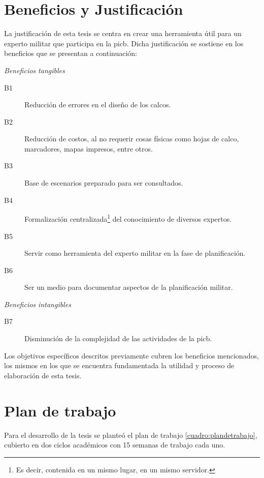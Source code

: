 
\section{Beneficios y Justificación}

La justificación de esta tesis se centra en crear una herramienta útil para un experto militar que participa en la \gls{picb}. Dicha justificación se sostiene en los beneficios que se presentan a continuación:

\emph{\footnotesize Beneficios tangibles}
\begin{description}
\item[B1] Reducción de errores en el diseño de los calcos.
\item[B2] Reducción de costos, al no requerir cosas físicas como hojas de calco, marcadores, mapas impresos, entre otros.
\item[B3] Base de escenarios preparado para ser consultados.
\item[B4] Formalización centralizada\footnote{Es decir, contenida en un mismo lugar, en un mismo servidor.}  del conocimiento de diversos expertos.
\item[B5] Servir como herramienta del experto militar en la fase de planificación.
\item[B6] Ser un medio para documentar aspectos de la planificación militar.

\end{description}

\emph{\footnotesize Beneficios intangibles}
\begin{description}
\item[B7] Disminución de la complejidad de las actividades de la \gls{picb}.
\end{description}

Los objetivos específicos descritos previamente cubren los beneficios mencionados, los mismos en los que se encuentra fundamentada la utilidad y proceso de elaboración de esta tesis.



\section{Plan de trabajo}

Para el desarrollo de la tesis se planteó el plan de trabajo \ref{cuadro:plandetrabajo}, cubierto en dos ciclos académicos con 15 semanas de trabajo cada uno.

